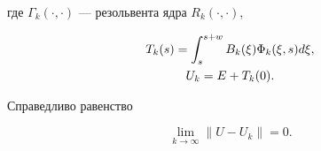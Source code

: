 где $\Gamma_k(\cdot,\cdot)$ --- резольвента ядра $R_k(\cdot,\cdot)$,


\begin{gather}


T_k(s)=\int_s^{s+w}B_k(\xi)\Phi_k(\xi,s)d\xi, \\


U_k=E+T_k(0).\notag


\end{gather}





\begin{lem} Справедливо равенство


\begin{equation}


\lim_{k\to\infty}\|U-U_k\|=0.


\end{equation}


\end{lem}





